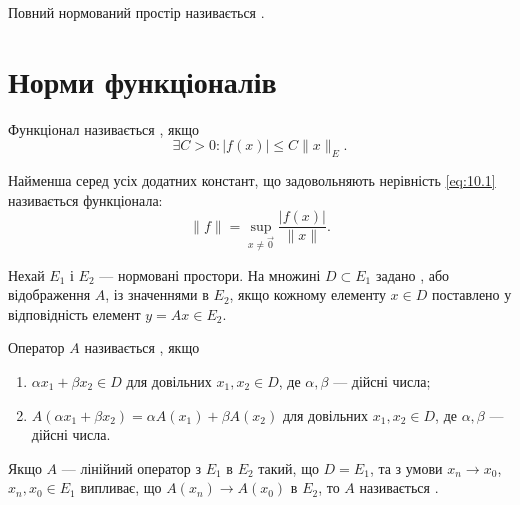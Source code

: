 \begin{definition}
Повний нормований простір називається .
\end{definition}

\section{Норми функціоналів}

\begin{definition}
Функціонал називається , якщо
\begin{equation}
    \label{eq:10.1}    
    \exists C > 0: |f(x)| \le C \|x\|_E.
\end{equation}
\end{definition}

\begin{definition}
Найменша серед усіх додатних констант, що
задовольняють нерівність \eqref{eq:10.1} називається 
функціонала:
\begin{equation*}
    \|f\| = \sup_{x \ne \vec 0} \frac{|f(x)|}{\|x\|}.
\end{equation*}
\end{definition}

\begin{definition}
Нехай $E_1$ і $E_2$ --- нормовані простори. На
множині $D \subset E_1$ задано , або відображення $A$, із
значеннями в $E_2$, якщо кожному елементу $x \in D$
поставлено у відповідність елемент $y = A x \in E_2$.
\end{definition}

\begin{definition}
Оператор $A$ називається , якщо
\begin{enumerate}
    \item $\alpha x_1 + \beta x_2 \in D$
    для довільних $x_1, x_2 \in D$,
    де $\alpha, \beta$ --- дійсні числа;
    \item $A(\alpha x_1 + \beta x_2) = \alpha A(x_1) + \beta A(x_2)$
    для довільних $x_1, x_2 \in D$,
    де $\alpha, \beta$ --- дійсні числа.
\end{enumerate}
\end{definition}

\begin{definition}
Якщо $A$ --- лінійний оператор з $E_1$ в $E_2$ такий,
що $D = E_1$, та з умови $x_n \to x_0$, $x_n, x_0 \in E_1$ випливає, що
$A(x_n) \to A(x_0)$ в $E_2$, то $A$ називається .
\end{definition}

